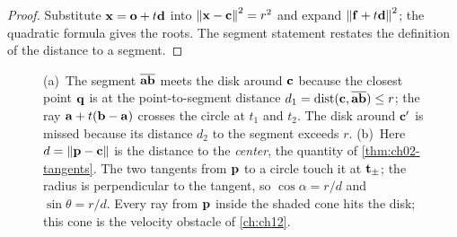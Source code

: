 \begin{proof}
Substitute $\mathbf{x}=\mathbf{o}+t\mathbf{d}$ into $\left\lVert \mathbf{x}-\mathbf{c} \right\rVert^2=r^2$ and expand $\left\lVert \mathbf{f}+t\mathbf{d} \right\rVert^2$; the quadratic formula gives the roots. The segment statement restates the definition of the distance to a segment. \qedhere
\end{proof}

\begin{figure}[tb]
  \centering
  \caption{(a)~The segment $\overline{\mathbf{a}\mathbf{b}}$ meets the disk around $\mathbf{c}$ because the closest point $\mathbf{q}$ is at the point-to-segment distance $d_1=\operatorname{dist}(\mathbf{c},\overline{\mathbf{a}\mathbf{b}})\le r$; the ray $\mathbf{a}+t(\mathbf{b}-\mathbf{a})$ crosses the circle at $t_1$ and $t_2$. The disk around $\mathbf{c}'$ is missed because its distance $d_2$ to the segment exceeds $r$. (b)~Here $d=\left\lVert \mathbf{p}-\mathbf{c} \right\rVert$ is the distance to the \emph{center}, the quantity of \cref{thm:ch02-tangents}. The two tangents from $\mathbf{p}$ to a circle touch it at $\mathbf{t}_{\pm}$; the radius is perpendicular to the tangent, so $\cos\alpha=r/d$ and $\sin\theta=r/d$. Every ray from $\mathbf{p}$ inside the shaded cone hits the disk; this cone is the velocity obstacle of \cref{ch:ch12}.}
  \label{fig:ch02-segment-circle}
\end{figure}

